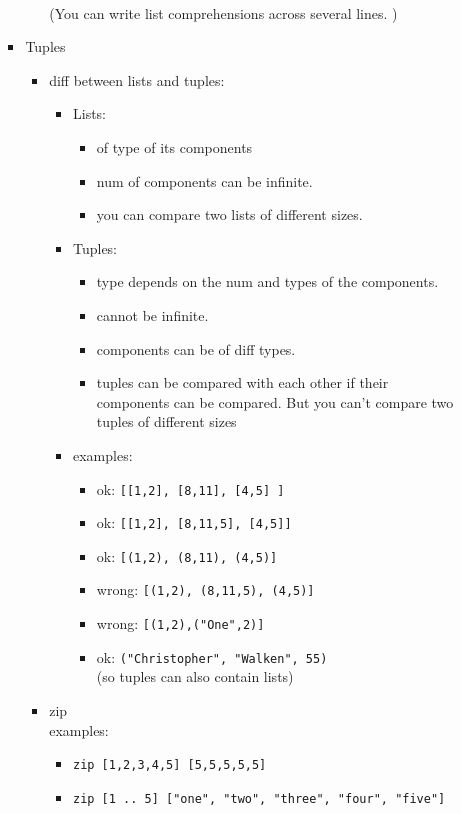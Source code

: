 \documentclass[a4paper,10pt]{article}
\begin{document}
\begin{enumerate}
\begin{enumerate}
\begin{itemize}
\begin{itemize}
   \\(You can write list comprehensions across several lines. )
  \end{itemize}
  \item Tuples
  \begin{itemize}
   \item diff between lists and tuples:
   \begin{itemize}
    \item Lists: 
    \begin{itemize}
     \item of type of its components
     \item num of components can be infinite.
     \item you can compare two lists of different sizes. 
    \end{itemize}
    \item Tuples: 
    \begin{itemize}
     \item type depends on the num and types of the components. 
     \item cannot be infinite.
     \item components can be of diff types.
     \item  tuples can be compared with each other if their components can be compared. But you can't compare two tuples of different sizes
    \end{itemize}
    \item examples:
    \begin{itemize}
     \item ok: \texttt{[[1,2], [8,11], [4,5] ]}
     \item ok: \texttt{[[1,2], [8,11,5], [4,5]]}
     \item ok: \texttt{[(1,2), (8,11), (4,5)]}
     \item wrong: \texttt{[(1,2), (8,11,5), (4,5)]}
     \item wrong: \texttt{[(1,2),("One",2)]}
     \item ok: \texttt{("Christopher", "Walken", 55)} 
     \\(so tuples can also contain lists)
    \end{itemize}
   \end{itemize}
   \item zip 
   \\examples:
   \begin{itemize}
    \item \texttt{zip [1,2,3,4,5] [5,5,5,5,5]}
    \item \texttt{zip [1 .. 5] ["one", "two", "three", "four", "five"]}

\end{itemize}
\end{itemize}
\end{itemize}
\end{enumerate}
\end{enumerate}
\end{document}
